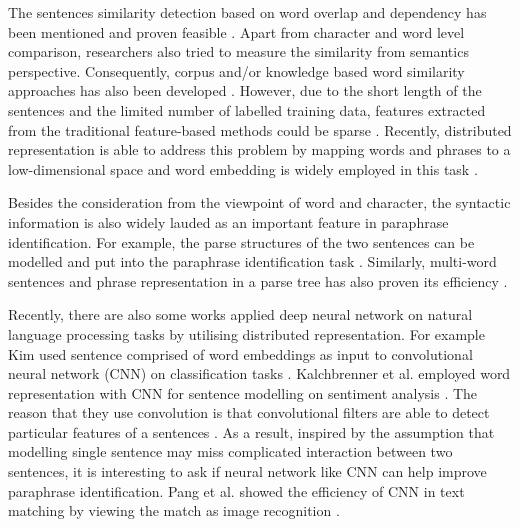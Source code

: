 \documentclass[conference]{IEEEtran}
\begin{document}
The sentences similarity detection based on word overlap and dependency has been mentioned and proven feasible \cite{selfdef:conf/altw/WanDDP06}. Apart from character and word level comparison, researchers also tried to measure the similarity from semantics perspective. Consequently, corpus and/or knowledge based word similarity approaches has also been developed \cite{DBLP:conf/aaai/MihalceaCS06}. However, due to the short length of the sentences and the limited number of labelled training data, features extracted from the traditional feature-based methods could be sparse \cite{DBLP:conf/emnlp/HeGL15}. Recently, distributed representation is able to address this problem by mapping words and phrases to a low-dimensional space and word embedding is widely employed in this task \cite{DBLP:conf/emnlp/Kim14}.

Besides the consideration from the viewpoint of word and character, the syntactic information is also widely lauded as an important feature in paraphrase identification. For example, the parse structures of the two sentences can be modelled and put into the paraphrase identification task \cite{DBLP:conf/acl/DasS09}. Similarly, multi-word sentences and phrase representation in a parse tree has also proven its efficiency \cite{DBLP:conf/nips/SocherHPNM11}.

Recently, there are also some works applied deep neural network on natural language processing tasks by utilising distributed representation. For example Kim used sentence comprised of word embeddings as input to convolutional neural network (CNN) on classification tasks \cite{DBLP:conf/emnlp/Kim14}. Kalchbrenner et al. employed word representation with CNN for sentence modelling on sentiment analysis \cite{DBLP:conf/acl/KalchbrennerGB14}. The reason that they use convolution is that convolutional filters are able to detect particular features of a sentences \cite{DBLP:conf/naacl/YinS15}. As a result, inspired by the assumption that modelling single sentence may miss complicated interaction between two sentences, it is interesting to ask if neural network like CNN can help improve paraphrase identification. Pang et al. showed the efficiency of CNN in text matching by viewing the match as image recognition \cite{DBLP:conf/aaai/PangLGXWC16}.
\end{document}
